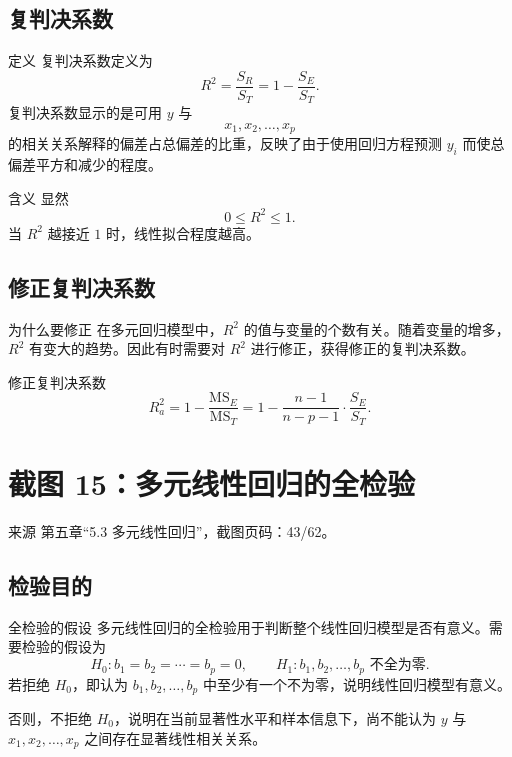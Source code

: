 \documentclass[UTF8,zihao=-4,fontset=fandol]{ctexart}
\begin{document}
\subsection{复判决系数}

\begin{keybox}{定义}
复判决系数定义为
\[
R^2=\frac{S_R}{S_T}
=1-\frac{S_E}{S_T}.
\]
复判决系数显示的是可用 $y$ 与
\[
x_1,x_2,\ldots,x_p
\]
的相关关系解释的偏差占总偏差的比重，反映了由于使用回归方程预测 $y_i$ 而使总偏差平方和减少的程度。
\end{keybox}

\begin{methodbox}{含义}
显然
\[
0\le R^2\le 1.
\]
当 $R^2$ 越接近 $1$ 时，线性拟合程度越高。
\end{methodbox}

\subsection{修正复判决系数}

\begin{warnbox}{为什么要修正}
在多元回归模型中，$R^2$ 的值与变量的个数有关。随着变量的增多，$R^2$ 有变大的趋势。因此有时需要对 $R^2$ 进行修正，获得修正的复判决系数。
\end{warnbox}

\begin{keybox}{修正复判决系数}
\[
R_a^2
=1-\frac{\mathrm{MS}_E}{\mathrm{MS}_T}
=1-\frac{n-1}{n-p-1}\cdot\frac{S_E}{S_T}.
\]
\end{keybox}

\section{截图 15：多元线性回归的全检验}

\begin{sourcebox}{来源}
第五章“5.3 多元线性回归”，截图页码：43/62。
\end{sourcebox}

\subsection{检验目的}

\begin{keybox}{全检验的假设}
多元线性回归的全检验用于判断整个线性回归模型是否有意义。需要检验的假设为
\[
H_0:b_1=b_2=\cdots=b_p=0,
\qquad
H_1:b_1,b_2,\ldots,b_p\text{ 不全为零}.
\]
若拒绝 $H_0$，即认为 $b_1,b_2,\ldots,b_p$ 中至少有一个不为零，说明线性回归模型有意义。

否则，不拒绝 $H_0$，说明在当前显著性水平和样本信息下，尚不能认为 $y$ 与 $x_1,x_2,\ldots,x_p$ 之间存在显著线性相关关系。
\end{keybox}
\end{document}
